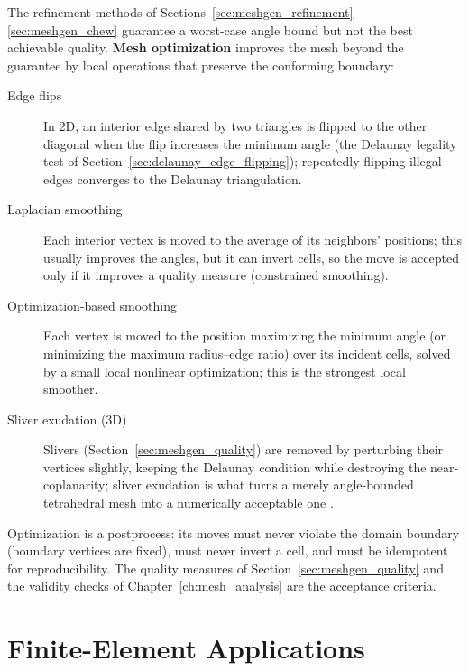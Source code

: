 The refinement methods of Sections~\ref{sec:meshgen_refinement}--\ref{sec:meshgen_chew}
guarantee a worst-case angle bound but not the best achievable quality.
\textbf{Mesh optimization} improves the mesh
beyond the guarantee by local operations that preserve the conforming
boundary:

\begin{description}
  \item[Edge flips] In 2D, an interior edge shared by two triangles is
    flipped to the other diagonal when the flip increases the minimum angle
    (the Delaunay legality test of Section~\ref{sec:delaunay_edge_flipping});
    repeatedly flipping illegal edges converges to the Delaunay
    triangulation.
  \item[Laplacian smoothing] Each interior vertex is moved to the average
    of its neighbors' positions; this usually improves the angles, but it
    can invert cells, so the move is accepted only if it improves a quality
    measure (constrained smoothing).
  \item[Optimization-based smoothing] Each vertex is moved to the position
    maximizing the minimum angle (or minimizing the maximum
    radius--edge ratio) over its incident cells, solved by a small local
    nonlinear optimization; this is the strongest local smoother.
  \item[Sliver exudation (3D)] Slivers (Section~\ref{sec:meshgen_quality})
    are removed by perturbing their vertices slightly, keeping the
    Delaunay condition while destroying the near-coplanarity; sliver
    exudation is what turns a merely angle-bounded tetrahedral mesh into a
    numerically acceptable one \cite{si2015}.
\end{description}

Optimization is a postprocess: its moves must never violate the domain
boundary (boundary vertices are fixed), must never invert a cell, and must
be idempotent for reproducibility. The quality measures of
Section~\ref{sec:meshgen_quality} and the validity checks of
Chapter~\ref{ch:mesh_analysis} are the acceptance criteria.


\section{Finite-Element Applications}
\label{sec:meshgen_fem}

